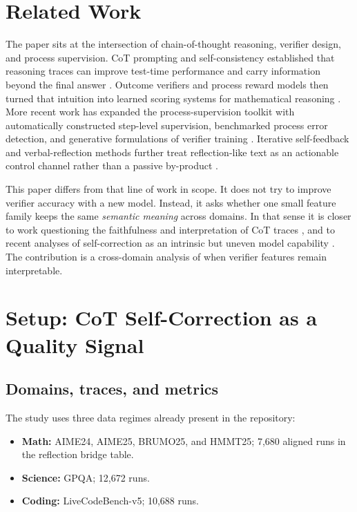 \documentclass[10pt]{article}
\begin{document}
\section{Related Work}

The paper sits at the intersection of chain-of-thought reasoning, verifier design, and process supervision. CoT prompting and self-consistency established that reasoning traces can improve test-time performance and carry information beyond the final answer \citep{wei2022cot,wang2023selfconsistency}. Outcome verifiers and process reward models then turned that intuition into learned scoring systems for mathematical reasoning \citep{cobbe2021training,lightman2023verify}. More recent work has expanded the process-supervision toolkit with automatically constructed step-level supervision, benchmarked process error detection, and generative formulations of verifier training \citep{wang2024mathshepherd,zheng2025processbench,zhang2025genrm}. Iterative self-feedback and verbal-reflection methods further treat reflection-like text as an actionable control channel rather than a passive by-product \citep{madaan2023selfrefine,shinn2023reflexion}.

This paper differs from that line of work in scope. It does not try to improve verifier accuracy with a new model. Instead, it asks whether one small feature family keeps the same \emph{semantic meaning} across domains. In that sense it is closer to work questioning the faithfulness and interpretation of CoT traces \citep{lanham2023faithfulness}, and to recent analyses of self-correction as an intrinsic but uneven model capability \citep{liu2024intrinsic,huang2024selfcorrect}. The contribution is a cross-domain analysis of when verifier features remain interpretable.

\section{Setup: CoT Self-Correction as a Quality Signal}

\subsection{Domains, traces, and metrics}

The study uses three data regimes already present in the repository:
\begin{itemize}
    \item \textbf{Math:} AIME24, AIME25, BRUMO25, and HMMT25; 7,680 aligned runs in the reflection bridge table.
    \item \textbf{Science:} GPQA; 12,672 runs.
    \item \textbf{Coding:} LiveCodeBench-v5; 10,688 runs.
\end{itemize}
\end{document}
